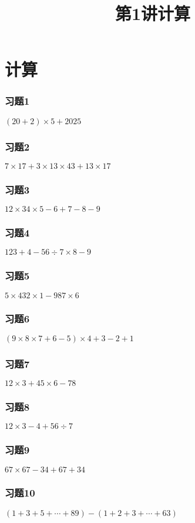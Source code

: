 \section{计算}

\title[第1讲\quad 计算]{第1讲\quad 计算} 
\author{}
\date{}
\begin{frame}
    \titlepage
\end{frame}

\begin{frame}
    \frametitle{习题1}
    \centering\textit{\Large $(20+2)\times 5 + 2025$}
\end{frame}

\begin{frame}
    \frametitle{习题2}
    \centering\textit{\Large $7\times 17 + 3\times 13\times 43 + 13\times 17$}
\end{frame}

\begin{frame}
    \frametitle{习题3}
    \centering\textit{\Large $12\times 34\times 5 - 6 + 7 - 8 - 9$}
\end{frame}

\begin{frame}
    \frametitle{习题4}
    \centering\textit{\Large $123 + 4 - 56\div 7\times 8 - 9$}
\end{frame}

\begin{frame}
    \frametitle{习题5}
    \centering\textit{\Large $5\times 432\times 1 - 98 7\times 6$}
\end{frame}

\begin{frame}
    \frametitle{习题6}
    \centering\textit{\Large $(9\times 8\times 7 + 6 - 5)\times 4 + 3 -2 +1$}
\end{frame}

\begin{frame}
    \frametitle{习题7}
    \centering\textit{\Large $12\times 3 + 45\times 6 - 78$}
\end{frame}

\begin{frame}
    \frametitle{习题8}
    \centering\textit{\Large $12\times 3 - 4 + 56\div 7$}
\end{frame}

\begin{frame}
    \frametitle{习题9}
    \centering\textit{\Large $67\times 67 - 34 + 67 + 34$}
\end{frame}

\begin{frame}
    \frametitle{习题10}
    \centering\textit{\Large $(1+3+5+\cdots + 89) - (1+2+3+\cdots + 63)$}
\end{frame}

